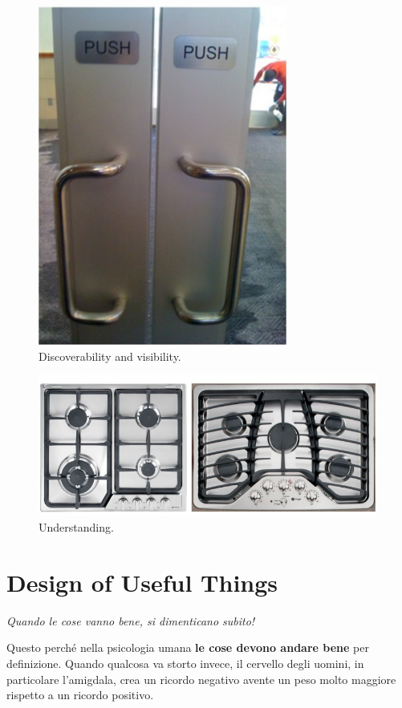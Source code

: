 \documentclass[a4paper,11pt,oneside]{book}
\begin{document}
\begin{figure}[!h]
	\centering
	\includegraphics[scale=0.3]{immagini/vis.png}
	\caption{Discoverability and visibility.}
\end{figure}

\begin{figure}[!h]
	\centering
	\includegraphics[scale=0.5]{immagini/Fornelli}
	\caption{Understanding.}
\end{figure}

\pagebreak

\section{Design of Useful Things}
\begin{flushleft}
	\textit{Quando le cose vanno bene, si dimenticano subito!}
\end{flushleft}
Questo perché nella psicologia umana \textbf{le cose devono andare bene} per definizione. Quando qualcosa va storto invece, il cervello degli uomini, in particolare l'amigdala, crea un ricordo negativo avente un peso molto maggiore rispetto a un ricordo positivo.
\end{document}
